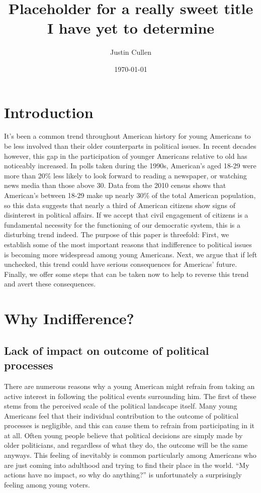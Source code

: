 \documentclass[12pt,letterpaper]{article}
\begin{document}
\title{Placeholder for a really sweet title I have yet to determine}
\author{Justin Cullen}
\date{\today}
\maketitle
\section{Introduction} %
\label{sec:Introduction}
It's been a common trend throughout American history for young
Americans to be less involved than their older
counterparts in political issues.  In recent decades however, this gap
in the participation of younger Americans relative to old has
noticeably increased. In polls taken during the 1990s, American's
aged 18-29 were more than 20\% less likely to look forward to reading
a newspaper, or watching news media than those above 30. Data from the
2010 census shows that American's between 18-29 make up nearly 30\% of
the total American population, so this data suggests that nearly a third of American citizens
show signs of disinterest in political affairs.  If we accept that
civil engagement of citizens is a fundamental necessity for the
functioning of our democratic system, this is a disturbing trend
indeed.  The purpose of this paper is threefold: First, we establish
some of the most important reasons that indifference to political
issues is becoming more widespread among young Americans.  Next, we
argue that if left unchecked, this trend could have serious
consequences for Americas' future.  Finally, we offer some steps that
can be taken now to help to reverse this trend and avert these
consequences.
\section{Why Indifference?} %
\label{sec:Why Indifference?}

\subsection{Lack of impact on outcome of political processes}
There are numerous reasons why a young American might refrain from
taking an active interest in following the political events
surrounding him.  The first of these stems from the perceived scale of
the political landscape itself.  Many young Americans feel that their
individual contribution to the outcome of political processes is
negligible, and this can cause them to refrain from participating
in it at all.  Often young people believe that political decisions are
simply made by older politicians, and regardless of what they do, the
outcome will be the same anyways.  This feeling of inevitably is
common particularly among Americans who are just coming into adulthood
and trying to find their place in the world. ``My actions have no
impact, so why do anything?'' is unfortunately a surprisingly feeling
among young voters.
\end{document}
